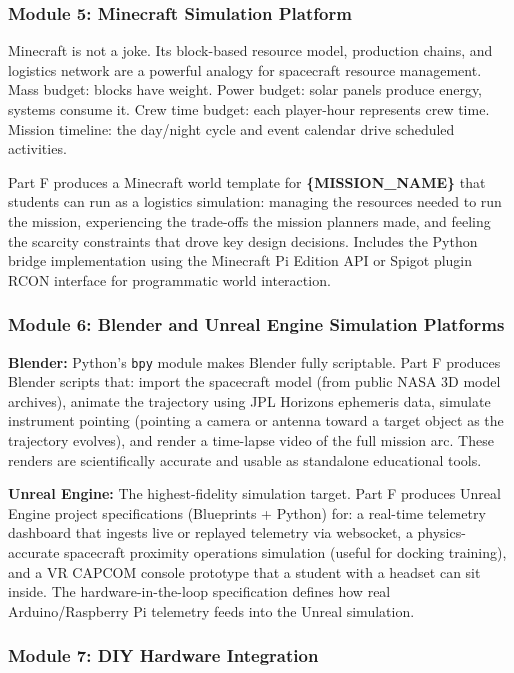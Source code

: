 \documentclass[11pt,letterpaper]{article}
\newcommand{\param}[1]{\textcolor{paramred}{\textbf{\{#1\}}}}
\begin{document}
\subsubsection{Module 5: Minecraft Simulation Platform}

Minecraft is not a joke. Its block-based resource model, production chains, and logistics network are a powerful analogy for spacecraft resource management. Mass budget: blocks have weight. Power budget: solar panels produce energy, systems consume it. Crew time budget: each player-hour represents crew time. Mission timeline: the day/night cycle and event calendar drive scheduled activities.

Part F produces a Minecraft world template for \param{MISSION\_NAME} that students can run as a logistics simulation: managing the resources needed to run the mission, experiencing the trade-offs the mission planners made, and feeling the scarcity constraints that drove key design decisions. Includes the Python bridge implementation using the Minecraft Pi Edition API or Spigot plugin RCON interface for programmatic world interaction.

\subsubsection{Module 6: Blender and Unreal Engine Simulation Platforms}

\textbf{Blender:} Python's \texttt{bpy} module makes Blender fully scriptable. Part F produces Blender scripts that: import the spacecraft model (from public NASA 3D model archives), animate the trajectory using JPL Horizons ephemeris data, simulate instrument pointing (pointing a camera or antenna toward a target object as the trajectory evolves), and render a time-lapse video of the full mission arc. These renders are scientifically accurate and usable as standalone educational tools.

\textbf{Unreal Engine:} The highest-fidelity simulation target. Part F produces Unreal Engine project specifications (Blueprints + Python) for: a real-time telemetry dashboard that ingests live or replayed telemetry via websocket, a physics-accurate spacecraft proximity operations simulation (useful for docking training), and a VR CAPCOM console prototype that a student with a headset can sit inside. The hardware-in-the-loop specification defines how real Arduino/Raspberry Pi telemetry feeds into the Unreal simulation.

\subsubsection{Module 7: DIY Hardware Integration}
\end{document}
